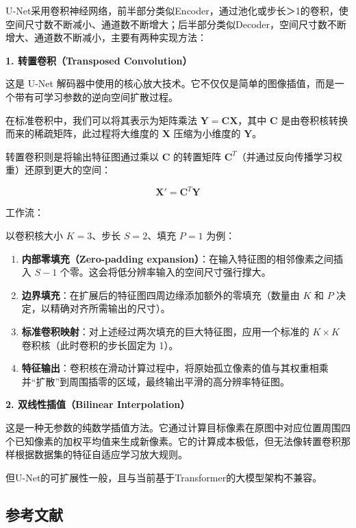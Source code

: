 U-Net采用卷积神经网络，前半部分类似Encoder，通过池化或步长＞1的卷积，使空间尺寸数不断减小、通道数不断增大；后半部分类似Decoder，空间尺寸数不断增大、通道数不断减小，主要有两种实现方法：

\textbf{1. 转置卷积（Transposed Convolution）}

这是 U-Net 解码器中使用的核心放大技术。它不仅仅是简单的图像插值，而是一个带有可学习参数的逆向空间扩散过程。

在标准卷积中，我们可以将其表示为矩阵乘法 \(\mathbf{Y}=\mathbf{C}\mathbf{X}\)，其中 \(\mathbf{C}\) 是由卷积核转换而来的稀疏矩阵，此过程将大维度的 \(\mathbf{X}\) 压缩为小维度的 \(\mathbf{Y}\)。

转置卷积则是将输出特征图通过乘以 \(\mathbf{C}\) 的转置矩阵 \(\mathbf{C}^T\)（并通过反向传播学习权重）还原到更大的空间：

\[
\mathbf{X}'=\mathbf{C}^T\mathbf{Y}
\]

工作流：

以卷积核大小 \(K=3\)、步长 \(S=2\)、填充 \(P=1\) 为例：

\begin{enumerate}
\def\labelenumi{\arabic{enumi}.}
\tightlist
\item
  \textbf{内部零填充（Zero-padding expansion）}：在输入特征图的相邻像素之间插入 \(S-1\) 个零。这会将低分辨率输入的空间尺寸强行撑大。
\item
  \textbf{边界填充}：在扩展后的特征图四周边缘添加额外的零填充（数量由 \(K\) 和 \(P\) 决定，以精确对齐所需输出的尺寸）。
\item
  \textbf{标准卷积映射}：对上述经过两次填充的巨大特征图，应用一个标准的 \(K\times K\) 卷积核（此时卷积的步长固定为 1）。
\item
  \textbf{特征输出}：卷积核在滑动计算过程中，将原始孤立像素的值与其权重相乘并``扩散''到周围插零的区域，最终输出平滑的高分辨率特征图。
\end{enumerate}

\textbf{2. 双线性插值（Bilinear Interpolation）}

这是一种无参数的纯数学插值方法。它通过计算目标像素在原图中对应位置周围四个已知像素的加权平均值来生成新像素。它的计算成本极低，但无法像转置卷积那样根据数据集的特征自适应学习放大规则。

但U-Net的可扩展性一般，且与当前基于Transformer的大模型架构不兼容。

\hypertarget{ux53c2ux8003ux6587ux732e-156}{%
\subsection{参考文献}\label{ux53c2ux8003ux6587ux732e-156}}

